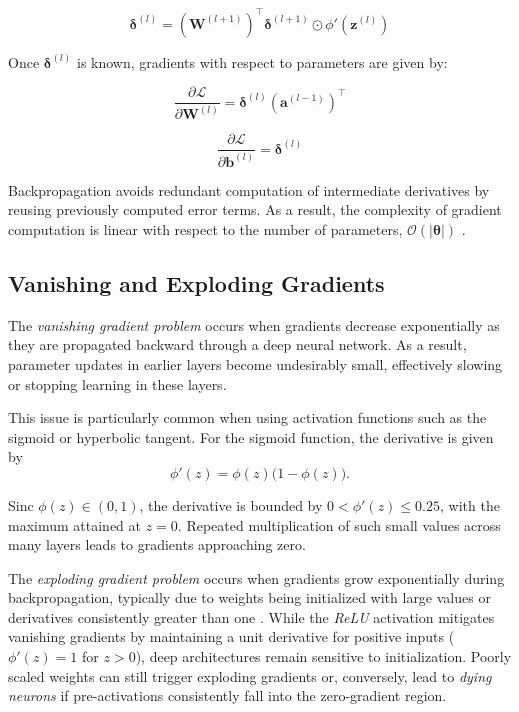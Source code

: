 \begin{equation*}
\boldsymbol{\delta}^{(l)} =
\left(\mathbf{W}^{(l+1)}\right)^{\top} \boldsymbol{\delta}^{(l+1)}
\odot \phi'\!\left(\mathbf{z}^{(l)}\right)
\end{equation*}

Once \( \boldsymbol{\delta}^{(l)} \) is known, gradients with respect to parameters are given by:

\begin{equation*}
\frac{\partial \mathcal{L}}{\partial \mathbf{W}^{(l)}} =
\boldsymbol{\delta}^{(l)} \left(\mathbf{a}^{(l-1)}\right)^{\top}
\end{equation*}

\begin{equation*}
\frac{\partial \mathcal{L}}{\partial \mathbf{b}^{(l)}} =
\boldsymbol{\delta}^{(l)}
\end{equation*}

Backpropagation avoids redundant computation of intermediate derivatives by reusing previously computed error terms. As a result, the complexity of gradient computation is linear with respect to the number of parameters, $\mathcal{O}(|\boldsymbol{\theta}|)$ \cite{goodfellow2016}.

\subsection{Vanishing and Exploding Gradients}
\label{subsec:vanishin-and-exploding-gradients}
The \emph{vanishing gradient problem} occurs when gradients decrease exponentially as they are propagated backward through a deep neural network. As a result, parameter updates in earlier layers become undesirably small, effectively slowing or stopping learning in these layers.

This issue is particularly common when using activation functions such as the sigmoid or hyperbolic tangent. For the sigmoid function, the derivative is given by
\begin{equation*}
\phi'(z) = \phi(z)\bigl(1 - \phi(z)\bigr).
\end{equation*}

Sinc $\phi(z) \in (0,1)$, the derivative is bounded by $0 < \phi'(z) \leq 0.25$, with the maximum attained at $z = 0$. Repeated multiplication of such small values across many layers leads to gradients approaching zero.

The \textit{exploding gradient problem} occurs when gradients grow exponentially during backpropagation, typically due to weights being initialized with large values or derivatives consistently greater than one \cite{goodfellow2016}. While the \textit{ReLU} activation mitigates vanishing gradients by maintaining a unit derivative for positive inputs ($\phi'(z) = 1$ for $z > 0$), deep architectures remain sensitive to initialization. Poorly scaled weights can still trigger exploding gradients or, conversely, lead to \textit{dying neurons} if pre-activations consistently fall into the zero-gradient region.

